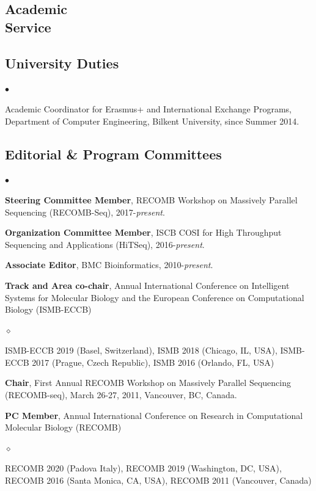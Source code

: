 \documentclass[margin,line]{res}
\newenvironment{list2}{
  \begin{list}{$\bullet$}{%
      \setlength{\itemsep}{0.1cm}
      \setlength{\parsep}{0in} \setlength{\parskip}{0in}
      \setlength{\topsep}{0in} \setlength{\partopsep}{0in} 
      \setlength{\leftmargin}{0.2in}}}{\end{list}}
\newenvironment{list3}{
  \begin{list}{$\diamond$}{%
      \setlength{\itemsep}{0in}
      \setlength{\parsep}{0.1cm} \setlength{\parskip}{0.1cm}
      \setlength{\topsep}{0.1cm} \setlength{\partopsep}{0.1cm} 
      \setlength{\leftmargin}{0.2in}}}{\end{list}}
\begin{document}
\begin{resume}
\vspace*{-.2cm}
\section{\sc Academic \\ Service}
\vspace{-0.3cm}
\subsection{\small \sc University Duties}
\begin{list2}
\item
  Academic Coordinator for Erasmus+ and International Exchange Programs, Department of Computer Engineering, Bilkent University, since Summer 2014.
\end{list2}
\vspace{-0.4cm}

\subsection{\small \sc Editorial \& Program Committees}
\begin{list2}
\item
  \textbf{Steering Committee Member}, RECOMB Workshop on Massively Parallel Sequencing (RECOMB-Seq), 2017-{\it present}.
\item
  \textbf{Organization Committee Member}, ISCB COSI for High Throughput Sequencing and Applications (HiTSeq),
  2016-{\it present}.
\item
  \textbf{Associate Editor}, BMC Bioinformatics, 2010-{\it present}.


\item
  \textbf{Track and Area co-chair}, Annual International Conference on Intelligent Systems for Molecular Biology and the European Conference on 
  Computational Biology (ISMB-ECCB)
  \begin{list3}
    \item ISMB-ECCB 2019 (Basel, Switzerland), ISMB 2018 (Chicago, IL, USA), ISMB-ECCB 2017 (Prague, Czech Republic), ISMB 2016 (Orlando, FL, USA)
  \end{list3}

\item
  \textbf{Chair}, First Annual RECOMB Workshop on Massively Parallel Sequencing (RECOMB-seq), March 26-27, 2011, Vancouver, BC, Canada.
  
  \item
  \textbf{PC Member}, Annual International Conference on Research in Computational Molecular Biology (RECOMB)
  \begin{list3}
    \item RECOMB 2020 (Padova Italy), RECOMB 2019 (Washington, DC, USA),  RECOMB 2016 (Santa Monica, CA, USA), RECOMB 2011 (Vancouver, Canada)
  \end{list3}
  

\end{list2}
\end{resume}
\end{document}
